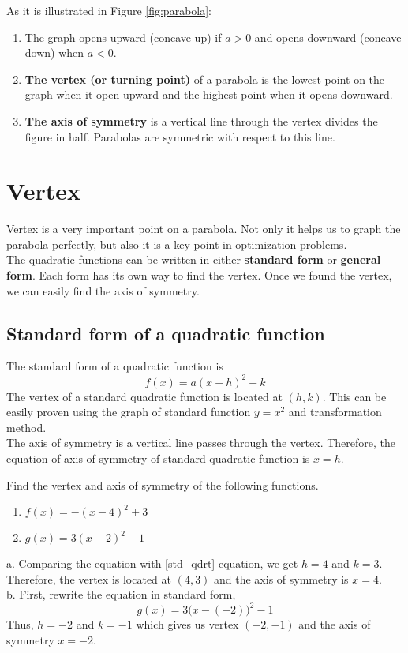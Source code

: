 As it is illustrated in Figure \ref{fig:parabola}:
\begin{enumerate}[1.]
    \item The graph opens upward (concave up) if $a>0$ and opens downward (concave down) when $a<0$.
    \item \textbf{The vertex (or turning point)} of a parabola is the lowest point on the graph when it open upward and the highest point when it opens downward.
    \item \textbf{The axis of symmetry} is a  vertical line through the vertex divides the figure in half.  Parabolas are symmetric with respect to this line.
\end{enumerate}
\section{Vertex}
Vertex is a very important point on a parabola. Not only it helps us to graph the parabola perfectly, but also it is a key point in optimization problems.\\
The quadratic functions can be written in either \textbf{standard form} or \textbf{general form}. Each form has its own way to find the vertex. Once we found the vertex, we can easily find the axis of symmetry.
\subsection{Standard form of a quadratic function}
The standard form of a quadratic function is 
\begin{equation}
            f(x) = a(x-h)^2+k
            \label{std_qdrt}
\end{equation}
The vertex of a standard quadratic function is located at $(h,k)$. This can be easily proven using the graph of standard function $y=x^2$ and transformation method.\\
The axis of symmetry is a vertical line passes through the vertex. Therefore, the equation of axis of symmetry of standard quadratic function is $x=h$.
\begin{exa}
    Find the vertex and axis of symmetry of the following functions.
    \begin{enumerate}[\bfseries a.]
        \item $f(x)= -(x-4)^2+3$
        \item $g(x)= 3(x+2)^2-1$
    \end{enumerate}
\end{exa}
%
a. Comparing the equation with \eqref{std_qdrt} equation, we get $h=4$ and $k=3$. Therefore, the vertex is located at $(4,3)$ and the axis of symmetry is $x=4$.\\[0.5cm]
%
b. First, rewrite the equation in standard form, 
\[
        g(x)=3\bigr(x-(-2)\bigl)^2-1
\]
Thus, $h=-2$ and $k=-1$ which gives us vertex $(-2,-1)$ and the axis of symmetry $x=-2$.
